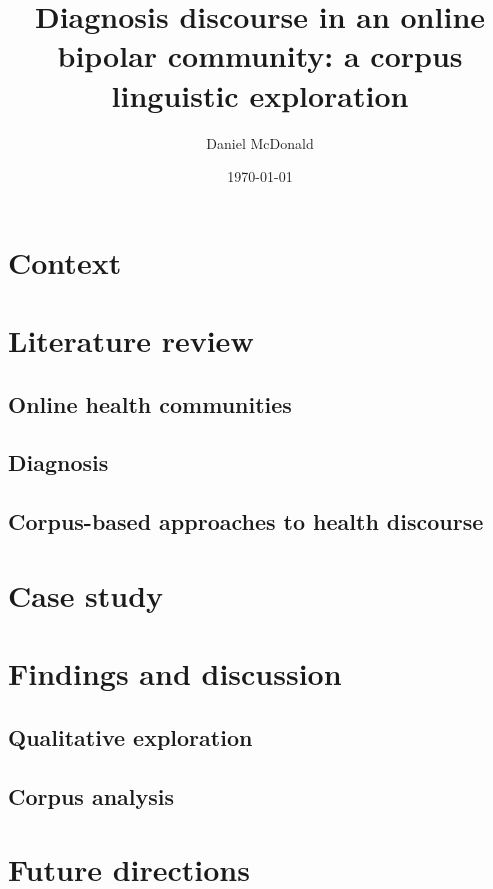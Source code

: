 \documentclass{article}
\author{Daniel McDonald}
\date{\today}
\title{Diagnosis discourse in an online bipolar community: a corpus linguistic exploration}
\begin{document}
\maketitle

\section{Context}

\section{Literature review}

\subsection{Online health communities}

\subsection{Diagnosis}

\subsection{Corpus-based approaches to health discourse}

\section{Case study}

\section{Findings and discussion}

\subsection{Qualitative exploration}

\subsection{Corpus analysis}

\section{Future directions}

\printbibliography[heading=bibintoc]
\end{document}
